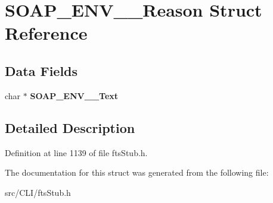 \section{SOAP\_\-ENV\_\-\_\-Reason Struct Reference}
\label{structSOAP__ENV____Reason}
\subsection*{Data Fields}
\begin{DoxyCompactItemize}
\item 
char $\ast$ {\bfseries SOAP\_\-ENV\_\-\_\-Text}\label{structSOAP__ENV____Reason_a4e7a5850ce6987bf6d15bf9fea780ecd}

\end{DoxyCompactItemize}


\subsection{Detailed Description}


Definition at line 1139 of file ftsStub.h.



The documentation for this struct was generated from the following file:\begin{DoxyCompactItemize}
\item 
src/CLI/ftsStub.h\end{DoxyCompactItemize}
